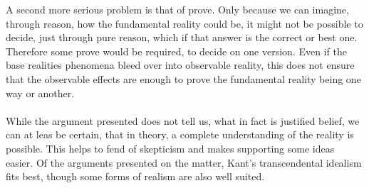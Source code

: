 \documentclass[fleqn,14pt]{article}
\begin{document}
A second more serious problem is that of prove. Only because we can imagine, through reason, 
how the fundamental reality could be, it might not be possible to decide, just through pure reason, which
if that answer is the correct or best one. Therefore some prove would be required, to decide on one version.
Even if the base realities phenomena bleed over into observable reality, this does not ensure that the
observable effects are enough to prove the fundamental reality being one way or another. \\
\\

While the argument presented does not tell us, what in fact is justified belief, we can at leas be certain,
that in theory, a complete understanding of the reality is possible. This helps to fend of skepticism and
makes supporting some ideas easier. Of the arguments presented on the matter, Kant's transcendental idealism
fits best, though some forms of realism are also well suited.


\printbibliography 
\end{document}
